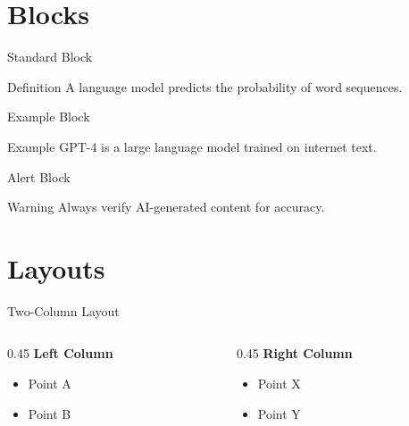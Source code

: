 \documentclass[aspectratio=169]{beamer}
\begin{document}
\section{Blocks}

\begin{frame}{Standard Block}
\begin{block}{Definition}
A language model predicts the probability of word sequences.
\end{block}
\end{frame}

\begin{frame}{Example Block}
\begin{exampleblock}{Example}
GPT-4 is a large language model trained on internet text.
\end{exampleblock}
\end{frame}

\begin{frame}{Alert Block}
\begin{alertblock}{Warning}
Always verify AI-generated content for accuracy.
\end{alertblock}
\end{frame}

\section{Layouts}

\begin{frame}{Two-Column Layout}
\begin{columns}[T]
\begin{column}{0.45\textwidth}
\textbf{Left Column}
\begin{itemize}
    \item Point A
    \item Point B
\end{itemize}
\end{column}

\begin{column}{0.45\textwidth}
\textbf{Right Column}
\begin{itemize}
    \item Point X
    \item Point Y
\end{itemize}
\end{column}
\end{columns}
\end{frame}
\end{document}
